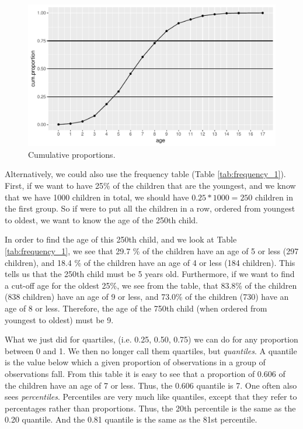 \documentclass[]{report}\usepackage[]{graphicx}\usepackage[]{color}
\makeatletter
\def\maxwidth{ %
  \ifdim\Gin@nat@width>\linewidth
    \linewidth
  \else
    \Gin@nat@width
  \fi
}
\makeatother
\begin{document}
\begin{figure}

{\centering \includegraphics[width=\maxwidth]{figure/quartile_2-1} 

}

\caption[Cumulative proportions]{Cumulative proportions.}\label{fig:quartile_2}
\end{figure}




Alternatively, we could also use the frequency table (Table \ref{tab:frequency_1}). First, if we want to have 25\% of the children that are the youngest, and we know that we have 1000 children in total, we should have $0.25 * 1000=250$ children in the first group. So if were to put all the children in a row, ordered from youngest to oldest, we want to know the age of the 250th child.

In order to find the age of this 250th child, and we look at Table \ref{tab:frequency_1}, we see that 29.7 \% of the children have an age of 5 or less (297 children), and 18.4 \% of the children have an age of 4 or less (184 children). This tells us that the 250th child must be 5 years old. Furthermore, if we want to find a cut-off age for the oldest 25\%, we see from the table, that 83.8\% of the children (838 children) have an age of 9 or less, and 73.0\% of the children (730) have an age of 8 or less. Therefore, the age of the 750th child (when ordered from youngest to oldest) must be 9.


What we just did for quartiles, (i.e. 0.25, 0.50, 0.75) we can do for any proportion between 0 and 1. We then no longer call them quartiles, but \textit{quantiles}. A quantile is the value below which a given proportion of observations in a group of observations fall. From this table it is easy to see that a proportion of 0.606 of the children have an age of 7 or less. Thus, the 0.606 quantile is 7. One often also sees \textit{percentiles}. Percentiles are very much like quantiles, except that they refer to percentages rather than proportions. Thus, the 20th percentile is the same as the 0.20 quantile. And the 0.81 quantile is the same as the 81st percentile.
\end{document}
